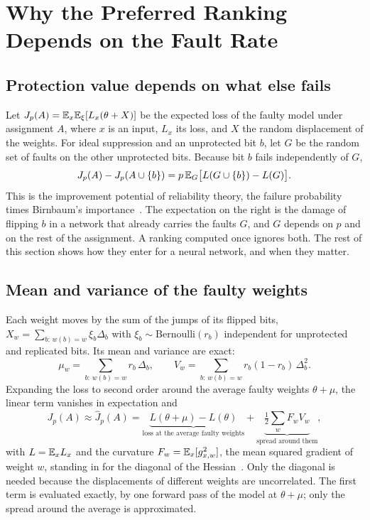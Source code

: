 \section{Why the Preferred Ranking Depends on the Fault Rate}\label{sec:theory}\label{sec:allocation}
\subsection{Protection value depends on what else fails}
Let $J_p(A)=\mathbb{E}_x\mathbb{E}_\xi[L_x(\theta+X)]$ be the expected loss of the faulty model under assignment $A$, where $x$ is an input, $L_x$ its loss, and $X$ the random displacement of the weights. For ideal suppression and an unprotected bit $b$, let $G$ be the random set of faults on the other unprotected bits. Because bit $b$ fails independently of $G$,
\begin{equation}\label{eq:protection-benefit}
J_p(A)-J_p(A\cup\{b\})=p\,\mathbb{E}_G\big[L(G\cup\{b\})-L(G)\big].
\end{equation}
This is the improvement potential of reliability theory, the failure probability times Birnbaum's importance~\cite{birnbaum1969importance,rausand2004system}. The expectation on the right is the damage of flipping $b$ in a network that already carries the faults $G$, and $G$ depends on $p$ and on the rest of the assignment. A ranking computed once ignores both. The rest of this section shows how they enter for a neural network, and when they matter.

\subsection{Mean and variance of the faulty weights}
Each weight moves by the sum of the jumps of its flipped bits, $X_w=\sum_{b:\,w(b)=w}\xi_b\Delta_b$ with $\xi_b\sim\mathrm{Bernoulli}(r_b)$ independent for unprotected and replicated bits. Its mean and variance are exact:
\begin{equation}\label{eq:moments}
\mu_w=\sum_{b:\,w(b)=w}r_b\,\Delta_b,\qquad V_w=\sum_{b:\,w(b)=w}r_b(1-r_b)\,\Delta_b^2 .
\end{equation}
Expanding the loss to second order around the average faulty weights $\theta+\mu$, the linear term vanishes in expectation and
\begin{equation}\label{eq:jhat}
J_p(A)\approx\hat J_p(A)=\underbrace{L(\theta+\mu)-L(\theta)}_{\text{loss at the average faulty weights}}+\underbrace{\tfrac12\textstyle\sum_w F_w V_w}_{\text{spread around them}},
\end{equation}
with $L=\mathbb{E}_xL_x$ and the curvature $F_w=\mathbb{E}_x[g_{x,w}^2]$, the mean squared gradient of weight $w$, standing in for the diagonal of the Hessian~\cite{lecun1989optimal,hassibi1992surgeon}. Only the diagonal is needed because the displacements of different weights are uncorrelated. The first term is evaluated exactly, by one forward pass of the model at $\theta+\mu$; only the spread around the average is approximated.

